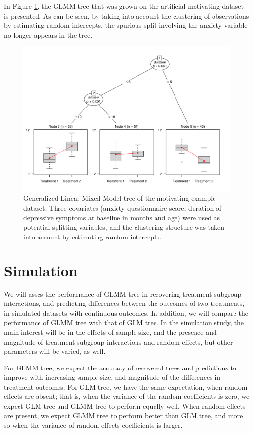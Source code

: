 \documentclass[nobf,doc]{apa}
\begin{document}
In Figure \ref{fig:example_glimmertree}, the GLMM tree that was grown on the artificial motivating dataset is presented. As can be seen, by taking into account the clustering of observations by estimating random intercepts, the spurious split involving the anxiety variable no longer appears in the tree. 

\begin{figure}[!h]
    \includegraphics[width=12cm]{glimmertree_example.pdf}
    \caption{Generalized Linear Mixed Model tree of the motivating example dataset. Three covariates (anxiety questionnaire score, duration of depressive symptoms at baseline in months and age) were used as potential splitting variables, and the clustering structure was taken into account by estimating random intercepts.}
    \label{fig:example_glimmertree}
\end{figure}


\section{Simulation}

We will asses the performance of GLMM tree in recovering treatment-subgroup interactions, and predicting differences between the outcomes of two treatments, in simulated datasets with continuous outcomes. In addition, we will compare the performance of GLMM tree with that of GLM tree. In the simulation study, the main interest will be in the effects of sample size, and the presence and magnitude of treatment-subgroup interactions and random effects, but other parameters will be varied, as well. 

For GLMM tree, we expect the accuracy of recovered trees and predictions to improve with increasing sample size, and magnitude of the differences in treatment outcomes. For GLM tree, we have the same expectation, when random effects are absent; that is, when the variance of the random coefficients is zero, we expect GLM tree and GLMM tree to perform equally well. When random effects are present, we expect GLMM tree to perform better than GLM tree, and more so when the variance of random-effects coefficients is larger.
\end{document}

